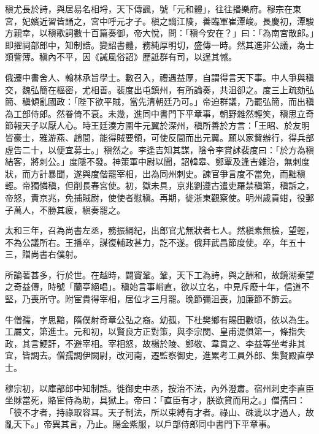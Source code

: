 \begin{pinyinscope}
 稹尤長於詩，與居易名相埒，天下傳諷，號「元和體」，往往播樂府。穆宗在東宮，妃嬪近習皆誦之，宮中呼元才子。稹之謫江陵，善臨軍崔潭峻。長慶初，潭駿方親幸，以稹歌詞數十百篇奏御，帝大悅，問：「稹今安在？」曰：「為南宮散郎。」即擢祠部郎中，知制誥。變詔書體，務純厚明切，盛傳一時。然其進非公議，為士類訾薄。稹內不平，因《誡風俗詔》歷詆群有司，以逞其憾。



 俄遷中書舍人、翰林承旨學士。數召入，禮遇益厚，自謂得言天下事。中人爭與稹交，魏弘簡在樞密，尤相善。裴度出屯鎮州，有所論奏，共沮卻之。度三上疏劾弘簡、稹傾亂國政：「陛下欲平賊，當先清朝廷乃可。」帝迫群議，乃罷弘簡，而出稹為工部侍郎。然眷倚不衰。未幾，進同中書門下平章事，朝野雜然輕笑，稹思立奇節報天子以厭人心。時王廷湊方圍牛元翼於深州，稹所善於方言：「王昭、於友明皆豪士，雅游燕、趙間，能得賊要領，可使反間而出元翼。願以家貲辦行，得兵部虛告二十，以便宜募士。」稹然之。李逢吉知其謀，陰令李賞訹裴度曰：「於方為稹結客，將刺公。」度隱不發。神策軍中尉以聞，詔韓皋、鄭覃及逢吉雜治，無刺度狀，而方計暴聞，遂與度偕罷宰相，出為同州刺史。諫官爭言度不當免，而黜稹輕。帝獨憐稹，但削長春宮使。初，獄未具，京兆劉遵古遣吏羅禁稹第，稹訴之，帝怒，責京兆，免捕賊尉，使使者慰稹。再期，徙浙東觀察使。明州歲貢蚶，役郵子萬人，不勝其疲，稹奏罷之。



 太和三年，召為尚書左丞，務振綱紀，出郎官尤無狀者七人。然稹素無檢，望輕，不為公議所右。王播卒，謀復輔政甚力，訖不遂。俄拜武昌節度使。卒，年五十三，贈尚書右僕射。



 所論著甚多，行於世。在越時，闢竇鞏。鞏，天下工為詩，與之酬和，故鏡湖秦望之奇益傳，時號「蘭亭絕唱」。稹始言事峭直，欲以立名，中見斥廢十年，信道不堅，乃喪所守。附宦貴得宰相，居位才三月罷。晚節彌沮喪，加廉節不飾云。



 牛僧孺，字思黯，隋僕射奇章公弘之裔。幼孤，下杜樊鄉有賜田數頃，依以為生。工屬文，第進士。元和初，以賢良方正對策，與李宗閔、皇甫湜俱第一，條指失政，其言鯁訐，不避宰相。宰相怒，故楊於陵、鄭敬、韋貫之、李益等坐考非其宜，皆調去。僧孺調伊闕尉，改河南，遷監察御史，進累考工員外郎、集賢殿直學士。



 穆宗初，以庫部郎中知制誥。徙御史中丞，按治不法，內外澄肅。宿州刺史李直臣坐賕當死，賂宦侍為助，具獄上。帝曰：「直臣有才，朕欲貸而用之。」僧孺曰：「彼不才者，持祿取容耳。天子制法，所以束縛有才者。祿山、硃泚以才過人，故亂天下。」帝異其言，乃止。賜金紫服，以戶部侍郎同中書門下平章事。




\end{pinyinscope}
